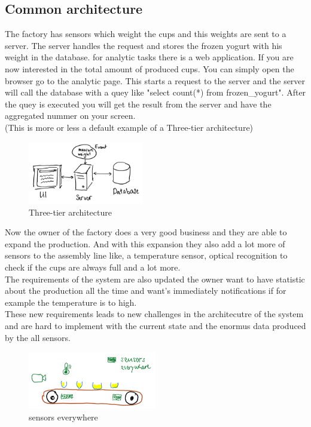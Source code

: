 \subsection{Common architecture}
The factory has sensors which weight the cups and this weights are sent to a server.
The server handles the request and stores the frozen yogurt with his weight in the database.
for analytic tasks there is a web application. If you are now interested in the total amount of produced cups.
You can simply open the browser go to the analytic page.
This starts a request to the server and the server will call the database with a quey like "select count(*) from frozen\_yogurt".
After the quey is executed you will get the result from the server and have the aggregated nummer on your screen.\\
(This is more or less a default example of a Three-tier architecture)

\begin{figure}[H]
\centering
\captionsetup{justification=centering}
\includegraphics[width=0.45\textwidth]{images/three_tier.png}
\caption[Three-tier architecture]{Three-tier architecture}
\end{figure}

\newpage

Now the owner of the factory does a very good business and they are able to expand the production.
And with this expansion they also add a lot more of sensors to the assembly line like, a temperature sensor,
optical recognition to check if the cups are always full and a lot more.\\
The requirements of the system are also updated the owner want to have statistic about the production all the time
and want's immediately notifications if for example the temperature is to high.\\
These new requirements leads to new challenges in the architecutre of the system and are hard to implement with the
current state and the enormus data produced by the all sensors.

\begin{figure}[H]
\centering
\captionsetup{justification=centering}
\includegraphics[width=0.5\textwidth]{images/sensors.png}
\caption[sensors everywhere]{sensors everywhere}
\end{figure}

